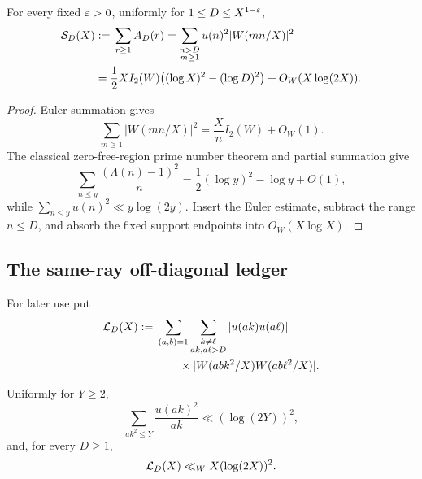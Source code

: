\begin{lemma}
\label{lem:source-diagonal}
For every fixed $\varepsilon>0$, uniformly for $1\leq D\leq X^{1-\varepsilon}$,
\begin{equation}
 \begin{aligned}
 \mathcal S_D(X)
 &:={}\sum_{r\geq1}A_D(r)
 =\sum_{\substack{n>D\\m\geq1}}
 u(n)^2|W(mn/X)|^2\\
 &=\frac12XI_2(W)
 \bigl((\log X)^2-(\log D)^2\bigr)
 +O_W(X\log(2X)).
 \end{aligned}
 \label{eq:source-diagonal}
\end{equation}
\end{lemma}

\begin{proof}
Euler summation gives
\[
 \sum_{m\geq1}|W(mn/X)|^2
 =\frac XnI_2(W)+O_W(1).
\]
The classical zero-free-region prime number theorem and partial summation
give \citep[Chapter~5]{IwaniecKowalski2004}
\begin{equation}
 \sum_{n\leq y}\frac{(\Lambda(n)-1)^2}{n}
 =\frac12(\log y)^2-\log y+O(1),
 \label{eq:u-square-harmonic}
\end{equation}
while $\sum_{n\leq y}u(n)^2\ll y\log(2y)$.  Insert the Euler estimate,
subtract the range $n\leq D$, and absorb the fixed support endpoints into
$O_W(X\log X)$.
\end{proof}

\subsection{The same-ray off-diagonal ledger}

For later use put
\begin{equation}
 \begin{aligned}
 \mathcal L_D(X):={}&
 \sum_{(a,b)=1}
 \sum_{\substack{k\ne\ell\\ak,a\ell>D}}
 |u(ak)u(a\ell)|\\
 &\qquad\times
 |W(abk^2/X)W(ab\ell^2/X)|.
 \end{aligned}
 \label{eq:source-offdiagonal-ledger}
\end{equation}

\begin{lemma}
\label{lem:source-ray-ledgers}
Uniformly for $Y\geq2$,
\begin{equation}
 \sum_{ak^2\leq Y}\frac{u(ak)^2}{ak}
 \ll(\log(2Y))^2,
 \label{eq:source-ray-square}
\end{equation}
and, for every $D\geq1$,
\begin{equation}
 \mathcal L_D(X)\ll_WX(\log(2X))^2.
 \label{eq:source-offdiagonal-bound}
\end{equation}
\end{lemma}

